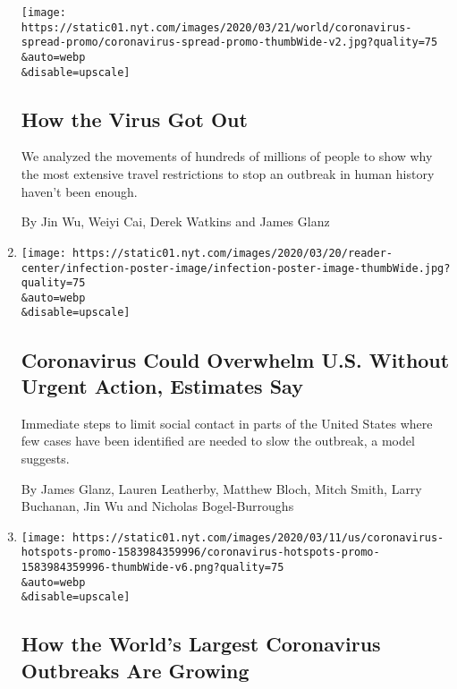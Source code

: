 \begin{enumerate}
  \texttt{[image: https://static01.nyt.com/images/2020/03/21/world/coronavirus-spread-promo/coronavirus-spread-promo-thumbWide-v2.jpg?quality=75\\\&auto=webp\\\&disable=upscale]}

  \hypertarget{how-the-virus-got-out}{%
  \subsection{How the Virus Got Out}\label{how-the-virus-got-out}}

  We analyzed the movements of hundreds of millions of people to show
  why the most extensive travel restrictions to stop an outbreak in
  human history haven't been enough.

  By Jin Wu, Weiyi Cai, Derek Watkins and James Glanz
\item
  \href{/interactive/2020/03/20/us/coronavirus-model-us-outbreak.html}{}

  \texttt{[image: https://static01.nyt.com/images/2020/03/20/reader-center/infection-poster-image/infection-poster-image-thumbWide.jpg?quality=75\\\&auto=webp\\\&disable=upscale]}

  \hypertarget{coronavirus-could-overwhelm-us-without-urgent-action-estimates-say}{%
  \subsection{Coronavirus Could Overwhelm U.S. Without Urgent Action,
  Estimates
  Say}\label{coronavirus-could-overwhelm-us-without-urgent-action-estimates-say}}

  Immediate steps to limit social contact in parts of the United States
  where few cases have been identified are needed to slow the outbreak,
  a model suggests.

  By James Glanz, Lauren Leatherby, Matthew Bloch, Mitch Smith, Larry
  Buchanan, Jin Wu and Nicholas Bogel-Burroughs
\item
  \href{/interactive/2020/world/coronavirus-maps-italy-iran-korea.html}{}

  \texttt{[image: https://static01.nyt.com/images/2020/03/11/us/coronavirus-hotspots-promo-1583984359996/coronavirus-hotspots-promo-1583984359996-thumbWide-v6.png?quality=75\\\&auto=webp\\\&disable=upscale]}

  \hypertarget{how-the-worlds-largest-coronavirus-outbreaks-are-growing}{%
  \subsection{How the World's Largest Coronavirus Outbreaks Are
  Growing}\label{how-the-worlds-largest-coronavirus-outbreaks-are-growing}}


\end{enumerate}
